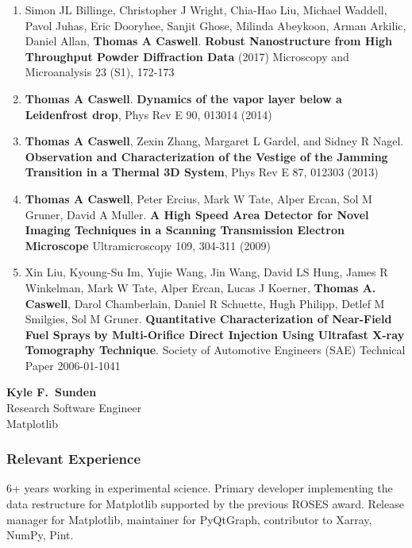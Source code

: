 \documentclass[12pt]{article}
\numberwithin{page}{section}
\begin{document}
\begin{enumerate}[noitemsep]
  \item Simon JL Billinge, Christopher J Wright, Chia-Hao Liu, Michael
    Waddell, Pavol Juhas, Eric Dooryhee, Sanjit Ghose, Milinda
    Abeykoon, Arman Arkilic, Daniel Allan, \textbf{Thomas A Caswell}.
    \textbf{Robust Nanostructure from High Throughput Powder
      Diffraction Data} (2017) Microscopy and Microanalysis 23 (S1),
    172-173

  \item \textbf{Thomas A Caswell}. \textbf{Dynamics of the vapor layer below a
      Leidenfrost drop}, Phys Rev E 90, 013014 (2014)

  \item \textbf{Thomas A Caswell}, Zexin Zhang, Margaret L Gardel, and
    Sidney R Nagel.  \textbf{Observation and Characterization of the
      Vestige of the Jamming Transition in a Thermal 3D System}, Phys
    Rev E 87, 012303 (2013)

  \item \textbf{Thomas A Caswell}, Peter Ercius, Mark W Tate, Alper
    Ercan, Sol M Gruner, David A Muller. \textbf{A High Speed Area
      Detector for Novel Imaging Techniques in a Scanning Transmission
      Electron Microscope} Ultramicroscopy 109, 304-311 (2009)

  \item Xin Liu, Kyoung-Su Im, Yujie Wang, Jin Wang, David LS Hung,
    James R Winkelman, Mark W Tate, Alper Ercan, Lucas J Koerner,
    \textbf{Thomas A. Caswell}, Darol Chamberlain, Daniel R Schuette,
    Hugh Philipp, Detlef M Smilgies, Sol M Gruner. \textbf{Quantitative
      Characterization of Near-Field Fuel Sprays by Multi-Orifice
      Direct Injection Using Ultrafast X-ray Tomography Technique}.
    Society of Automotive Engineers (SAE) Technical Paper 2006-01-1041

\end{enumerate}

\newpage
\begin{center}
  \textbf{Kyle F.\ Sunden}\\
  Research Software Engineer\\
  Matplotlib\\
\end{center}

\subsubsection*{Relevant Experience}
6+ years working in experimental science.
Primary developer implementing the data restructure for Matplotlib supported by the previous ROSES award.
Release manager for Matplotlib, maintainer for PyQtGraph, contributor to Xarray, NumPy, Pint.
\end{document}
